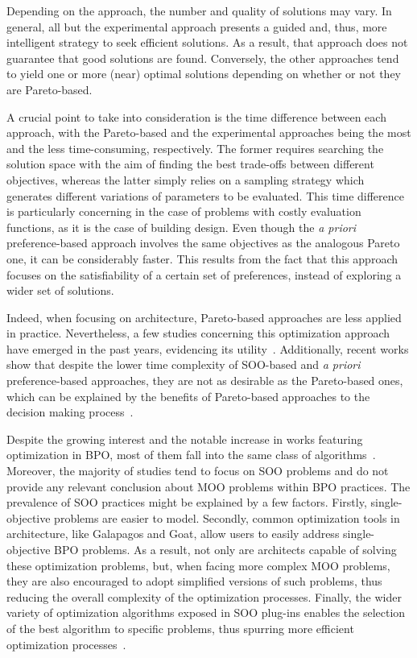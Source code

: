 	Depending on the approach, the number and quality of solutions may vary. In general, all but the experimental approach presents a guided and, thus, more intelligent strategy to seek efficient solutions. As a result, that approach does not guarantee that good solutions are found. Conversely, the other approaches tend to yield one or more (near) optimal solutions depending on whether or not they are Pareto-based.
	
	A crucial point to take into consideration is the time difference between each approach, with the Pareto-based and the experimental approaches being the most and the less time-consuming, respectively. The former requires searching the solution space with the aim of finding the best trade-offs between different objectives, whereas the latter simply relies on a sampling strategy which generates different variations of parameters to be evaluated. This time difference is particularly concerning in the case of problems with costly evaluation functions, as it is the case of building design. Even though the \textit{a priori} preference-based approach involves the same objectives as the analogous Pareto one, it can be considerably faster. This results from the fact that this approach focuses on the satisfiability of a certain set of preferences, instead of exploring a wider set of solutions.
	
	Indeed, when focusing on architecture, Pareto-based approaches are less applied in practice. Nevertheless, a few studies concerning this optimization approach have emerged in the past years, evidencing its utility~\cite{Evins2013,Hamdy2016}. Additionally, recent works show that despite the lower time complexity of \ac{SOO}-based and \textit{a priori} preference-based approaches, they are not as desirable as the Pareto-based ones, which can be explained by the benefits of Pareto-based approaches to the decision making process~\cite{Attia2013,Cichocka2017SURVEY}. %

	Despite the growing interest and the notable increase in works featuring optimization in \ac{BPO}, most of them fall into the same class of algorithms~\cite{Evins2013,Nguyen2014}. Moreover, the majority of studies tend to focus on \ac{SOO} problems and do not provide any relevant conclusion about \ac{MOO} problems within \ac{BPO} practices. The prevalence of \ac{SOO} practices might be explained by a few factors. Firstly, single-objective problems are easier to model. Secondly, common optimization tools in architecture, like Galapagos and Goat, allow users to easily address single-objective \ac{BPO} problems. As a result, not only are architects capable of solving these optimization problems, but, when facing more complex \ac{MOO} problems, they are also encouraged to adopt simplified versions of such problems, thus reducing the overall complexity of the optimization processes. Finally, the wider variety of optimization algorithms exposed in \ac{SOO} plug-ins enables the selection of the best algorithm to specific problems, thus spurring more efficient optimization processes~\cite{Wortmann2016BBO}.  
	
